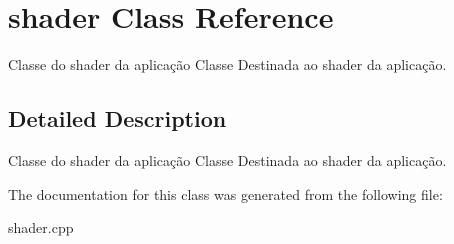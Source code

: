 \hypertarget{classshader}{\section{shader Class Reference}
\label{classshader}
}


Classe do shader da aplicação Classe Destinada ao shader da aplicação.  




\subsection{Detailed Description}
Classe do shader da aplicação Classe Destinada ao shader da aplicação. 

The documentation for this class was generated from the following file\-:\begin{DoxyCompactItemize}
\item 
shader.\-cpp\end{DoxyCompactItemize}

